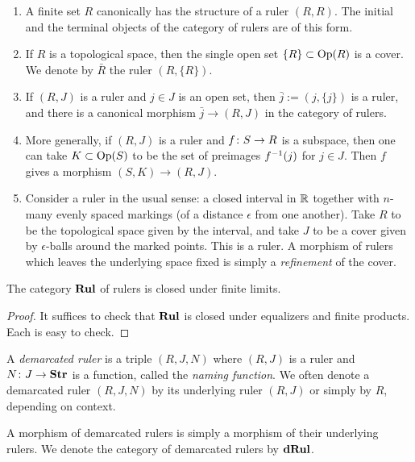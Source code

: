 \documentclass{amsart}
\def\Rul{{\bf Rul}}
\def\dRul{{\bf dRul}}
\def\j{\bar{j}}
\def\Str{{\bf Str}}
\begin{document}
\begin{example}

\begin{enumerate}

\item A finite set $R$ canonically has the structure of a ruler $(R,R)$.  The initial and the terminal objects of the category of rulers are of this form.
\item If $R$ is a topological space, then the single open set $\{R\}\subset\textnormal{Op}(R)$ is a cover.  We denote by $\bar{R}$ the ruler $(R,\{R\})$.
\item If $(R,J)$ is a ruler and $j\in J$ is an open set, then $\j:=(j,\{j\})$ is a ruler, and there is a canonical morphism $\j\to (R,J)$ in the category of rulers. 
\item More generally, if $(R,J)$ is a ruler and $f\colon S\rightarrow R$ is a subspace, then one can take $K\subset\textnormal{Op}(S)$ to be the set of preimages $f^\m1(j)$ for $j\in J$.  Then $f$ gives a morphism $(S,K)\to(R,J)$.

\item Consider a ruler in the usual sense: a closed interval in ${\mathbb R}$ together with $n$-many evenly spaced markings (of a distance $\epsilon$ from one another).  Take $R$ to be the topological space given by the interval, and take $J$ to be a cover given by $\epsilon$-balls around the marked points.  This is a ruler.  A morphism of rulers which leaves the underlying space fixed is simply a {\em refinement} of the cover.

\end{enumerate}

\end{example}

\begin{lemma}

The category $\Rul$ of rulers is closed under finite limits.  

\end{lemma}

\begin{proof}

It suffices to check that $\Rul$ is closed under equalizers and finite products.  Each is easy to check.

\end{proof}

\begin{definition}

A {\em demarcated ruler} is a triple $(R,J,N)$ where $(R,J)$ is a ruler and $N\taking J\to\Str$ is a function, called the {\em naming function}.  We often denote a demarcated ruler $(R,J,N)$ by its underlying ruler $(R,J)$ or simply by $R$, depending on context.

A morphism of demarcated rulers is simply a morphism of their underlying rulers.  We denote the category of demarcated rulers by $\dRul$.

\end{definition}
\end{document}
